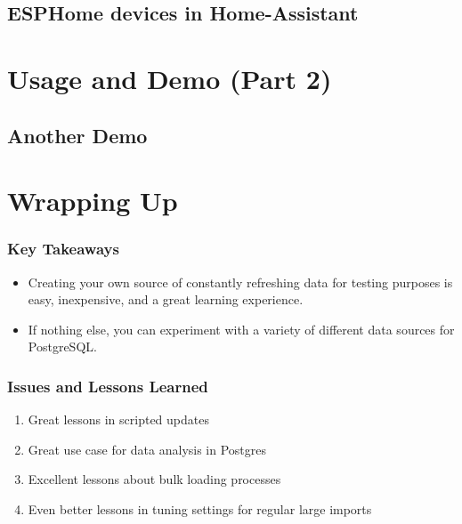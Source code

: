 \documentclass[aspectratio=169]{beamer}
\begin{document}
\subsection{ESPHome devices in Home-Assistant}
\frame{\subsectionpage}
\section{Usage and Demo (Part 2)}
\frame{\sectionpage}
\subsection{Another Demo}

\section{Wrapping Up}
\frame{\sectionpage}

\begin{frame}
  \frametitle{Key Takeaways}
  \begin{itemize}[<+->]
    \item{Creating your own source of constantly refreshing data for testing purposes is easy, inexpensive, and a great learning experience.}
    \item{If nothing else, you can experiment with a variety of different data sources for PostgreSQL.}
  \end{itemize}
\end{frame}

\begin{frame}[fragile]
  \frametitle{Issues and Lessons Learned}
  \begin{enumerate}
    \item{Great lessons in scripted updates}
    \item{Great use case for data analysis in Postgres}
    \item{Excellent lessons about bulk loading processes}
    \item{Even better lessons in tuning settings for regular large imports}
  \end{enumerate}
\end{frame}
\end{document}
